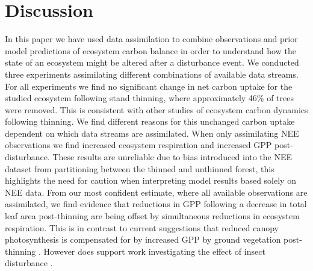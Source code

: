 \documentclass[draft,linenumbers]{agujournal}
\begin{document}
\section{Discussion}
In this paper we have used data assimilation to combine observations and prior model predictions of ecosystem carbon balance in order to understand how the state of an ecosystem might be altered after a disturbance event. We conducted three experiments assimilating different combinations of available data streams. For all experiments we find no significant change in net carbon uptake for the studied ecosystem following stand thinning, where approximately 46\% of trees were removed. This is consistent with other studies of ecosystem carbon dynamics following thinning. We find different reasons for this unchanged carbon uptake dependent on which data streams are assimilated. When only assimilating NEE observations we find increased ecosystem respiration and increased GPP post-disturbance. These results are unreliable due to bias introduced into the NEE dataset from partitioning between the thinned and unthinned forest, this highlights the need for caution when interpreting model results based solely on NEE data. From our most confident estimate, where all available observations are assimilated, we find evidence that reductions in GPP following a decrease in total leaf area post-thinning are being offset by simultaneous reductions in ecosystem respiration. This is in contrast to current suggestions that reduced canopy photosynthesis is compensated for by increased GPP by ground vegetation post-thinning \citep{vesala2005effect, wilkinson2015effects, moreaux2011paired, dore2012recovery}. However does support work investigating the effect of insect disturbance \citep{ELE:ELE12097}.
\end{document}
